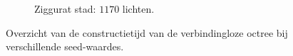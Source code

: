 \begin{figure}[t]
\begin{adjustbox}{minipage=\textwidth, scale=0.55}
\begin{subfigure}[b]{0.8\textwidth}
      \label{fig:hs-seed-exec:city-low}
    \end{subfigure}
  \end{adjustbox}\hspace{-0.075\textwidth}  %
  \begin{adjustbox}{minipage=\textwidth, scale=0.55}
    \begin{subfigure}[b]{0.8\textwidth}
      \centering
      \def\svgwidth{\textwidth}
      
      \caption{Ziggurat stad: $1170$ lichten.}
      \label{fig:hs-seed-exec:city-high}
    \end{subfigure}
  \end{adjustbox}
  \caption{Overzicht van de constructietijd van de verbindingloze octree bij
           verschillende seed-waardes.}
  \label{fig:hs-seed-exec}
\end{figure}

